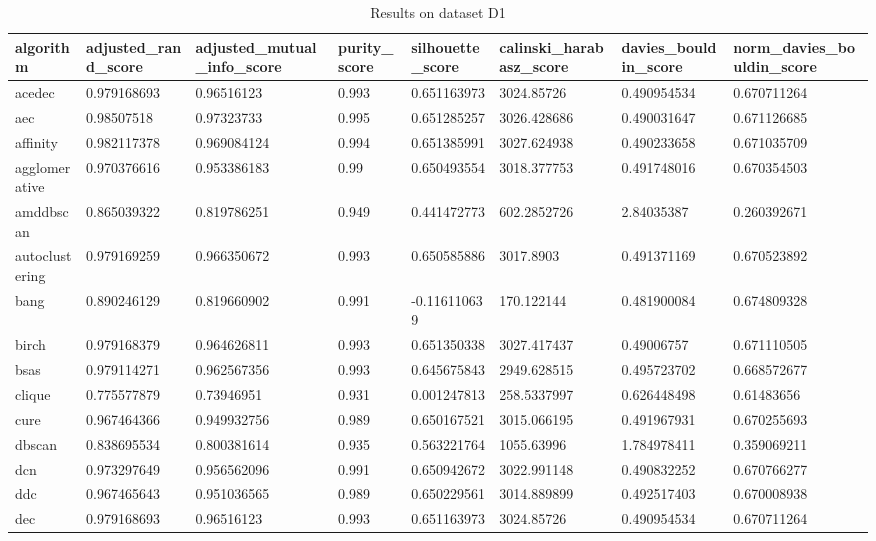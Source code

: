 \begin{table}[H]
\centering
\caption{Results on dataset D1}
\label{S54_Table}
\begin{tabular}{|l|l|l|l|l|l|l|l|}
\hline
algorithm & adjusted\_rand\_score & adjusted\_mutual\_info\_score & purity\_score & silhouette\_score & calinski\_harabasz\_score & davies\_bouldin\_score & norm\_davies\_bouldin\_score \\
\hline
acedec & 0.979168693 & 0.96516123 & 0.993 & 0.651163973 & 3024.85726 & 0.490954534 & 0.670711264 \\
\hline
aec & 0.98507518 & 0.97323733 & 0.995 & 0.651285257 & 3026.428686 & 0.490031647 & 0.671126685 \\
\hline
affinity & 0.982117378 & 0.969084124 & 0.994 & 0.651385991 & 3027.624938 & 0.490233658 & 0.671035709 \\
\hline
agglomerative & 0.970376616 & 0.953386183 & 0.99 & 0.650493554 & 3018.377753 & 0.491748016 & 0.670354503 \\
\hline
amddbscan & 0.865039322 & 0.819786251 & 0.949 & 0.441472773 & 602.2852726 & 2.84035387 & 0.260392671 \\
\hline
autoclustering & 0.979169259 & 0.966350672 & 0.993 & 0.650585886 & 3017.8903 & 0.491371169 & 0.670523892 \\
\hline
bang & 0.890246129 & 0.819660902 & 0.991 & -0.116110639 & 170.122144 & 0.481900084 & 0.674809328 \\
\hline
birch & 0.979168379 & 0.964626811 & 0.993 & 0.651350338 & 3027.417437 & 0.49006757 & 0.671110505 \\
\hline
bsas & 0.979114271 & 0.962567356 & 0.993 & 0.645675843 & 2949.628515 & 0.495723702 & 0.668572677 \\
\hline
clique & 0.775577879 & 0.73946951 & 0.931 & 0.001247813 & 258.5337997 & 0.626448498 & 0.61483656 \\
\hline
cure & 0.967464366 & 0.949932756 & 0.989 & 0.650167521 & 3015.066195 & 0.491967931 & 0.670255693 \\
\hline
dbscan & 0.838695534 & 0.800381614 & 0.935 & 0.563221764 & 1055.63996 & 1.784978411 & 0.359069211 \\
\hline
dcn & 0.973297649 & 0.956562096 & 0.991 & 0.650942672 & 3022.991148 & 0.490832252 & 0.670766277 \\
\hline
ddc & 0.967465643 & 0.951036565 & 0.989 & 0.650229561 & 3014.889899 & 0.492517403 & 0.670008938 \\
\hline
dec & 0.979168693 & 0.96516123 & 0.993 & 0.651163973 & 3024.85726 & 0.490954534 & 0.670711264 \\

\end{tabular}
\end{table}
